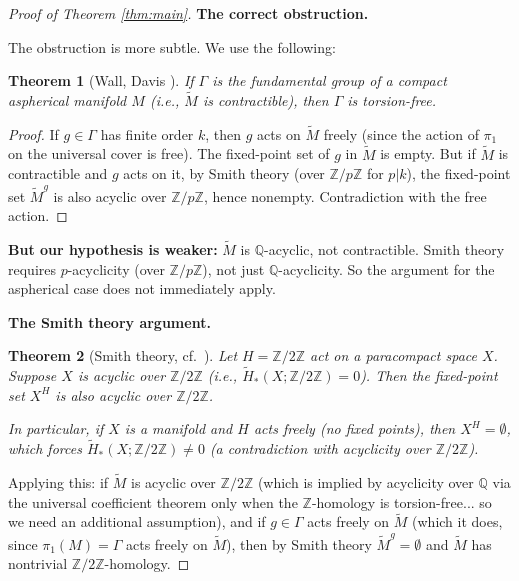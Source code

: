 \documentclass[12pt]{article}
\newtheorem{theorem}{Theorem}
\begin{document}
\begin{proof}[Proof of Theorem \ref{thm:main}]
\textbf{The correct obstruction.}

The obstruction is more subtle. We use the following:

\begin{theorem}[Wall, Davis \cite{Davis2000}]\label{thm:wall-davis}
If $\Gamma$ is the fundamental group of a compact aspherical manifold $M$ (i.e., $\widetilde{M}$ is contractible), then $\Gamma$ is torsion-free.
\end{theorem}

\begin{proof}
If $g \in \Gamma$ has finite order $k$, then $g$ acts on $\widetilde{M}$ freely (since the action of $\pi_1$ on the universal cover is free). The fixed-point set of $g$ in $\widetilde{M}$ is empty. But if $\widetilde{M}$ is contractible and $g$ acts on it, by Smith theory (over $\mathbb{Z}/p\mathbb{Z}$ for $p | k$), the fixed-point set $\widetilde{M}^g$ is also acyclic over $\mathbb{Z}/p\mathbb{Z}$, hence nonempty. Contradiction with the free action.
\end{proof}

\textbf{But our hypothesis is weaker:} $\widetilde{M}$ is $\mathbb{Q}$-acyclic, not contractible. Smith theory requires $p$-acyclicity (over $\mathbb{Z}/p\mathbb{Z}$), not just $\mathbb{Q}$-acyclicity. So the argument for the aspherical case does not immediately apply.

\textbf{The Smith theory argument.}

\begin{theorem}[Smith theory, cf.\ \cite{Bredon1972}]\label{thm:smith}
Let $H = \mathbb{Z}/2\mathbb{Z}$ act on a paracompact space $X$. Suppose $X$ is acyclic over $\mathbb{Z}/2\mathbb{Z}$ (i.e., $\tilde{H}_*(X; \mathbb{Z}/2\mathbb{Z}) = 0$). Then the fixed-point set $X^H$ is also acyclic over $\mathbb{Z}/2\mathbb{Z}$.

In particular, if $X$ is a manifold and $H$ acts freely (no fixed points), then $X^H = \emptyset$, which forces $\tilde{H}_*(X; \mathbb{Z}/2\mathbb{Z}) \neq 0$ (a contradiction with acyclicity over $\mathbb{Z}/2\mathbb{Z}$).
\end{theorem}

Applying this: if $\widetilde{M}$ is acyclic over $\mathbb{Z}/2\mathbb{Z}$ (which is implied by acyclicity over $\mathbb{Q}$ via the universal coefficient theorem only when the $\mathbb{Z}$-homology is torsion-free... so we need an additional assumption), and if $g \in \Gamma$ acts freely on $\widetilde{M}$ (which it does, since $\pi_1(M) = \Gamma$ acts freely on $\widetilde{M}$), then by Smith theory $\widetilde{M}^g = \emptyset$ and $\widetilde{M}$ has nontrivial $\mathbb{Z}/2\mathbb{Z}$-homology.


\end{proof}
\end{document}
